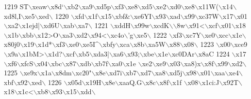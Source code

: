 \begin{DoxyCode}
1219 \textcolor{stringliteral}{ST\(\backslash\)xeaw\(\backslash\)x8d`\(\backslash\)xb2\(\backslash\)xa9\(\backslash\)xd5p\(\backslash\)xf3\(\backslash\)xe8\(\backslash\)xd5\(\backslash\)xe2\(\backslash\)xd0\(\backslash\)xe8\(\backslash\)x11W(\(\backslash\)x14\(\backslash\)xd8l,I\(\backslash\)xe5\(\backslash\)xed\(\backslash\)}
1220 \textcolor{stringliteral}{\(\backslash\)xfd\(\backslash\)x1f\(\backslash\)x15\(\backslash\)xbf&\(\backslash\)xe6YI\(\backslash\)x93\(\backslash\)xad\(\backslash\)x99\(\backslash\)xc37W\(\backslash\)x17\(\backslash\)x01\(\backslash\)xa2\(\backslash\)x1ejd|\(\backslash\)xd6U\(\backslash\)xab\(\backslash\)xa7\(\backslash\)}
1221 \textcolor{stringliteral}{\(\backslash\)xddH\(\backslash\)x99w\(\backslash\)xcdK\(\backslash\)\(\backslash\)8w\(\backslash\)x91<\(\backslash\)xcf\(\backslash\)x01\(\backslash\)x18\(\backslash\)x1b\(\backslash\)xbb\(\backslash\)x12>O\(\backslash\)xa3\(\backslash\)xd2\(\backslash\)x94<\(\backslash\)xc4o\(\backslash\)'g\(\backslash\)xe5\(\backslash\)}
1222 \textcolor{stringliteral}{\(\backslash\)xf3\(\backslash\)xc7Y\(\backslash\)xe0\(\backslash\)xcc\(\backslash\)x1e\(\backslash\)x80j0\(\backslash\)x19\(\backslash\)x1d*\(\backslash\)xf3\(\backslash\)xe0\(\backslash\)xe5I^\(\backslash\)xbfy\(\backslash\)xca\(\backslash\)x8b\(\backslash\)xa5W\(\backslash\)x88\(\backslash\)x08\(\backslash\)}
1223 \textcolor{stringliteral}{\(\backslash\)x00\(\backslash\)xce9\(\backslash\)x9a\(\backslash\)x1bM>\(\backslash\)x1d?\(\backslash\)xcf\(\backslash\)xb5\(\backslash\)xda3|\(\backslash\)xa6\(\backslash\)x93;\(\backslash\)xbe\(\backslash\)x1e\(\backslash\)xc0DAr\(\backslash\)x8aC%
1224 \textcolor{stringliteral}{\(\backslash\)x17\(\backslash\)xf6\(\backslash\)xfcS\(\backslash\)x04\(\backslash\)xbc\(\backslash\)x87\(\backslash\)xdb\(\backslash\)xb7f\(\backslash\)xa0\(\backslash\)x1e \(\backslash\)xe2\(\backslash\)xe9\(\backslash\)x03\(\backslash\)xa8)x\(\backslash\)x8f\(\backslash\)x99\(\backslash\)xd2\(\backslash\)}
1225 \textcolor{stringliteral}{\(\backslash\)xe9x\(\backslash\)x1a\(\backslash\)x8dm\(\backslash\)xc20"\(\backslash\)x8e\(\backslash\)xd7i\(\backslash\)xb7\(\backslash\)xd7\(\backslash\)xa8\(\backslash\)xd5j\(\backslash\)x98\(\backslash\)x01\(\backslash\)xaa\(\backslash\)xe4\(\backslash\)xbf\(\backslash\)x92\(\backslash\)xed\(\backslash\)}
1226 \textcolor{stringliteral}{\(\backslash\)x05d\(\backslash\)x19H\(\backslash\)x8e\(\backslash\)xaaQ.G\(\backslash\)x8c\(\backslash\)x8f\(\backslash\)x1f \(\backslash\)x08\(\backslash\)x1ci:J\(\backslash\)x92T\(\backslash\)x18\(\backslash\)x1c<\(\backslash\)xb8\(\backslash\)x93\(\backslash\)x15\(\backslash\)xdd\(\backslash\)}
}
\end{DoxyCode}
